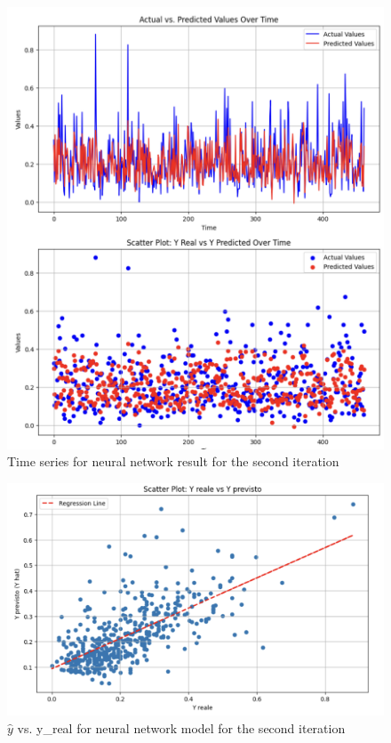 \documentclass[10pt]{article} %
\begin{document}
    \begin{figure}
        \centering
        \includegraphics[scale=0.4]{Assets/iteration 2/rnn_it2_1.png}
        \caption{Time series for neural network result for the second iteration}
        \label{fig:enter-label}
    \end{figure}

    \begin{figure}
        \centering
        \includegraphics[scale=0.4]{Assets/iteration 1/rnn_it1_2.png}
        \caption{$\hat{y}$ vs. y\_real for neural network model for the second iteration}
        \label{fig:enter-label}
    \end{figure}
    \newpage
\end{document}
